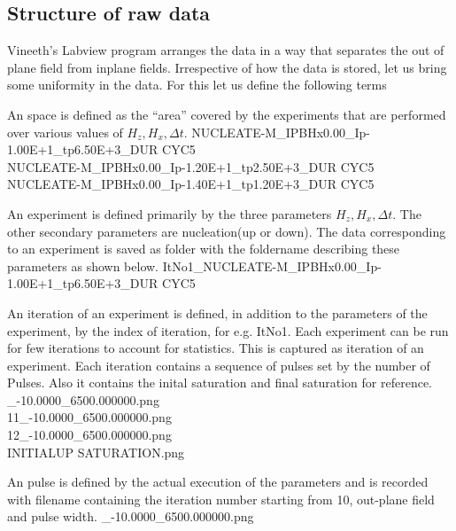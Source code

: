 \documentclass[12pt, twoside, a4paper]{article}
\begin{document}
\subsection{Structure of raw data}
Vineeth's Labview program arranges the data in a way that separates the out of plane field from inplane fields. Irrespective of how the data is stored, let us bring some uniformity in the data. For this let us define the following terms
%
\begin{tcolorbox}[ title = Space, colback = red!5!white, colframe = red!75!black, colbacktitle=red!25!white]
	An space is defined as the ``area'' covered by the experiments that are performed over various values of $H_{z}, H_{x}, \Delta t$. 
	\tcblower
	NUCLEATE-M\_IPBHx0.00\_Ip-1.00E+1\_tp6.50E+3\_DUR CYC5 \\
	NUCLEATE-M\_IPBHx0.00\_Ip-1.20E+1\_tp2.50E+3\_DUR CYC5 \\
	NUCLEATE-M\_IPBHx0.00\_Ip-1.40E+1\_tp1.20E+3\_DUR CYC5
\end{tcolorbox}
%
%
\begin{tcolorbox}[ title = Experiment, colback = red!5!white, colframe = red!75!black, colbacktitle=red!25!white]
An experiment is defined primarily by the three parameters $H_{z}, H_{x}, \Delta t$. The other secondary parameters are nucleation(up or down). The data corresponding to an experiment is saved as folder with the foldername describing these parameters as shown below.
\tcblower
	ItNo1\_NUCLEATE-M\_IPBHx0.00\_Ip-1.00E+1\_tp6.50E+3\_DUR CYC5
\end{tcolorbox}
%
%
\begin{tcolorbox}[ title = Iteration, colback = red!5!white, colframe = red!75!black, colbacktitle=red!25!white]
	An iteration of an experiment is defined, in addition to the parameters of the experiment, by the index of iteration, for e.g. ItNo1. Each experiment can be run for few iterations to account for statistics. This is captured as iteration of an experiment. Each iteration contains a sequence of pulses set by the number of Pulses. Also it contains the inital saturation and final saturation for reference.
	\_-10.0000\_6500.000000.png \\
	11\_-10.0000\_6500.000000.png \\
	12\_-10.0000\_6500.000000.png \\
	INITIALUP SATURATION.png
\end{tcolorbox}
%
%
\begin{tcolorbox}[ title = Pulse, colback = red!5!white, colframe = red!75!black, colbacktitle=red!25!white]
	An pulse is defined by the actual execution of the parameters and is recorded with filename containing the iteration number starting from 10, out-plane field and pulse width.
	\_-10.0000\_6500.000000.png
\end{tcolorbox}
%
\end{document}
